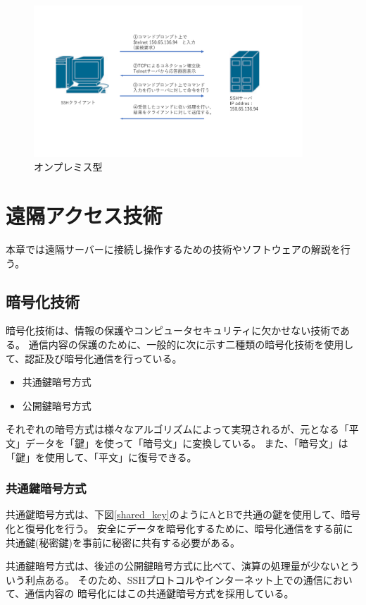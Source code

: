\documentclass[11pt,a4j,titlepage]{jreport}
\begin{document}
\begin{figure}[h]
    \centering
    \includegraphics*[width=0.9\textwidth,page=15]{graphs/network_archtecture.pdf}
    \caption{オンプレミス型}
    \label{onpremise_graph}
\end{figure}




\chapter{遠隔アクセス技術}
本章では遠隔サーバーに接続し操作するための技術やソフトウェアの解説を行う。

\section{暗号化技術}
暗号化技術は、情報の保護やコンピュータセキュリティに欠かせない技術である。
通信内容の保護のために、一般的に次に示す二種類の暗号化技術を使用して、認証及び暗号化通信を行っている。
\begin{itemize}
    \item 共通鍵暗号方式
    \item 公開鍵暗号方式
\end{itemize}
それぞれの暗号方式は様々なアルゴリズムによって実現されるが、元となる「平文」データを「鍵」を使って「暗号文」に変換している。
また、「暗号文」は「鍵」を使用して、「平文」に復号できる。

\subsection{共通鍵暗号方式}
共通鍵暗号方式は、下図\ref{shared_key}のようにAとBで共通の鍵を使用して、暗号化と復号化を行う。
安全にデータを暗号化するために、暗号化通信をする前に共通鍵(秘密鍵)を事前に秘密に共有する必要がある。

共通鍵暗号方式は、後述の公開鍵暗号方式に比べて、演算の処理量が少ないとういう利点ある。
そのため、SSHプロトコルやインターネット上での通信において、通信内容の
暗号化にはこの共通鍵暗号方式を採用している。
\end{document}

